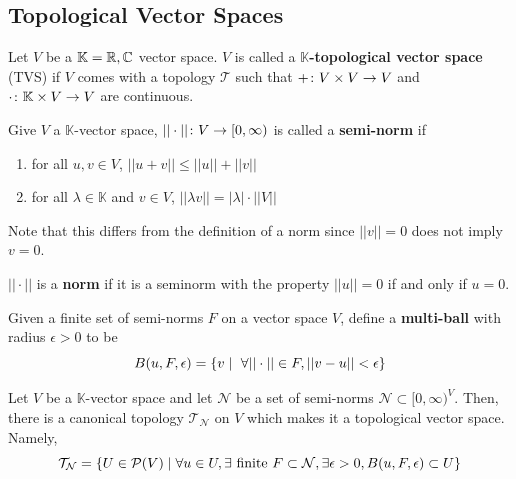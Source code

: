 \documentclass[11pt,leqno,oneside]{amsbook}
\numberwithin{thm}{section}
\renewcommand{\P}{\mathcal{P}} %
\newcommand{\Top}{\mathcal{T}} %
\newcommand{\cN}{\mathcal{N}}
\renewcommand{\de}{\textbf} %
\begin{document}
\subsection{Topological Vector Spaces}
\begin{defn}
  Let \(V\) be a \(\mathbb{K} = {\mathbb R},{\mathbb C}\) vector space. \(V\) is called
  a \de{\(\mathbb{K}\)-topological vector space} (TVS) if \(V\) comes with
  a topology \(\Top\) such that \(+ \colon V \times V \to V\) and
  \(\cdot \colon \mathbb{K} \times V \to V\) are continuous.
\end{defn}
\begin{defn}
  Give \(V\) a \(\mathbb{K}\)-vector space, \(||\cdot|| \colon V \to
  [0,\infty)\) is called a \de{semi-norm} if
  \begin{enumerate}
  \item for all \(u,v \in V\), \(||u+v|| \leq ||u|| + ||v||\)
  \item for all \(\lambda \in \mathbb{K}\) and \(v \in V\),
    \(||\lambda v|| = |\lambda|\cdot ||V||\)
  \end{enumerate}
\end{defn}
Note that this differs from the definition of a norm since \(||v||=0\)
does not imply \(v = 0\).
\begin{defn}
  \(||\cdot||\) is a \de{norm} if it is a seminorm with the property
  \(||u||=0\) if and only if \(u = 0\).
\end{defn}
\begin{defn}
  Given a finite set of semi-norms \(F\) on a vector space \(V\),
  define a \de{multi-ball} with radius \(\epsilon > 0\) to be \[
    B(u,F,\epsilon) = \left\{ v \st \ \forall ||\cdot|| \in F, ||v-u|| <
    \epsilon\right\}
  \]
\end{defn}
\begin{defn}
  Let \(V\) be a \(\mathbb{K}\)-vector space and let \(\cN\) be a set
  of semi-norms \(\cN \subset [0,\infty)^V \). Then, there is a
  canonical topology \(\Top_\cN\) on \(V\) which makes it a
  topological vector space. Namely, \[
    \Top_\cN = \left\{ U \in \P(V) \st \forall u \in U, \exists \text{
      finite } F \subset \cN, \exists \epsilon > 0,
  B(u,F,\epsilon) \subset U \right\}
  \]
\end{defn}
\end{document}
